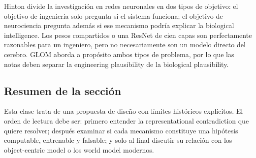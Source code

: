 Hinton divide la investigación en redes neuronales en dos tipos de objetivo: el objetivo de ingeniería solo pregunta si el sistema funciona; el objetivo de neurociencia pregunta además si ese mecanismo podría explicar la biological intelligence. Los pesos compartidos o una ResNet de cien capas son perfectamente razonables para un ingeniero, pero no necesariamente son un modelo directo del cerebro. GLOM aborda a propósito ambos tipos de problema, por lo que las notas deben separar la engineering plausibility de la biological plausibility.



\subsection{Resumen de la sección}

Esta clase trata de una propuesta de diseño con límites históricos explícitos. El orden de lectura debe ser: primero entender la representational contradiction que quiere resolver; después examinar si cada mecanismo constituye una hipótesis computable, entrenable y falsable; y solo al final discutir su relación con los object-centric model o los world model modernos.
